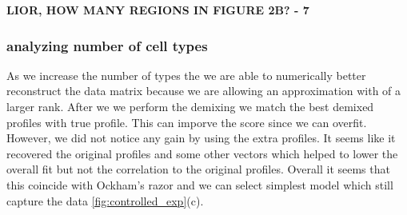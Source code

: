 {\bf{LIOR, HOW MANY REGIONS IN FIGURE 2B?        - 7}}



\subsubsection*{analyzing number of cell types}

As we increase the number of types the we are able to numerically better reconstruct the data matrix because we are allowing an approximation with of a larger rank. After we we perform the demixing we match the best demixed profiles with true profile. This can imporve the score since we can overfit. However, we did not notice any gain by using the extra profiles. It seems like it recovered the original profiles and some other vectors which helped to lower the overall fit but not the correlation to the original profiles. Overall it seems that this coincide with Ockham's razor and we can select simplest model which still capture the data \ref{fig:controlled_exp}(c). 



